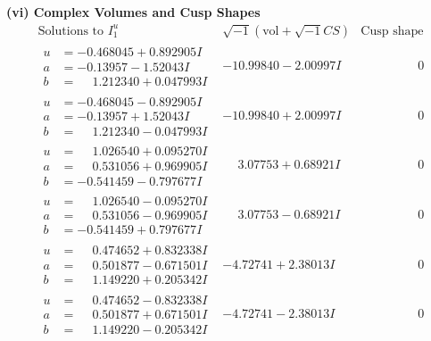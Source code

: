 \documentclass[1p]{elsarticle_modified}
\theoremstyle{definition}
\newcommand{\I}{\sqrt{-1}}
\begin{document}
\newpage\flushleft \textbf{(vi) Complex Volumes and Cusp Shapes}
$$\begin{array}{c|c|c}  
\text{Solutions to }I^u_{1}& \I (\text{vol} + \sqrt{-1}CS) & \text{Cusp shape}\\
 \hline 
\begin{aligned}
u &= -0.468045 + 0.892905 I \\
a &= -0.13957 - 1.52043 I \\
b &= \phantom{-}1.212340 + 0.047993 I\end{aligned}
 & -10.99840 - 2.00997 I & \phantom{-0.000000 } 0 \\ \hline\begin{aligned}
u &= -0.468045 - 0.892905 I \\
a &= -0.13957 + 1.52043 I \\
b &= \phantom{-}1.212340 - 0.047993 I\end{aligned}
 & -10.99840 + 2.00997 I & \phantom{-0.000000 } 0 \\ \hline\begin{aligned}
u &= \phantom{-}1.026540 + 0.095270 I \\
a &= \phantom{-}0.531056 + 0.969905 I \\
b &= -0.541459 - 0.797677 I\end{aligned}
 & \phantom{-}3.07753 + 0.68921 I & \phantom{-0.000000 } 0 \\ \hline\begin{aligned}
u &= \phantom{-}1.026540 - 0.095270 I \\
a &= \phantom{-}0.531056 - 0.969905 I \\
b &= -0.541459 + 0.797677 I\end{aligned}
 & \phantom{-}3.07753 - 0.68921 I & \phantom{-0.000000 } 0 \\ \hline\begin{aligned}
u &= \phantom{-}0.474652 + 0.832338 I \\
a &= \phantom{-}0.501877 - 0.671501 I \\
b &= \phantom{-}1.149220 + 0.205342 I\end{aligned}
 & -4.72741 + 2.38013 I & \phantom{-0.000000 } 0 \\ \hline\begin{aligned}
u &= \phantom{-}0.474652 - 0.832338 I \\
a &= \phantom{-}0.501877 + 0.671501 I \\
b &= \phantom{-}1.149220 - 0.205342 I\end{aligned}
 & -4.72741 - 2.38013 I & \phantom{-0.000000 } 0 \\ \hline\begin{aligned}

\end{aligned}
\end{array}$$
\end{document}
